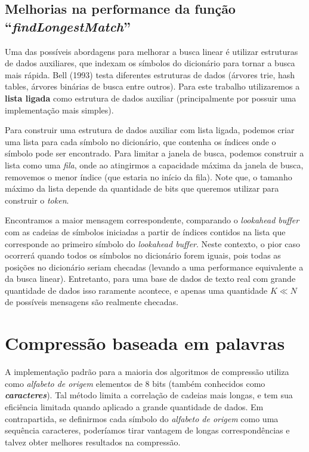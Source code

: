 \subsection{Melhorias na performance da função ``\emph{findLongestMatch}'' }

Uma das possíveis abordagens para melhorar a busca linear é utilizar estruturas de dados auxiliares, que indexam os símbolos do dicionário para tornar a busca mais rápida.
Bell (1993) \cite{TD}  testa diferentes estruturas de dados (árvores trie, hash tables, árvores binárias de busca entre outros). 
Para este trabalho utilizaremos a \textbf{lista ligada} como estrutura de dados auxiliar (principalmente por possuir uma implementação mais simples). 

Para construir uma estrutura de dados auxiliar com lista ligada, podemos criar uma lista para cada símbolo no dicionário, que contenha os índices onde o símbolo pode ser encontrado.  
Para limitar a janela de busca, podemos construir a lista como uma \emph{fila}, onde ao atingirmos a capacidade máxima da janela de busca, removemos o menor índice (que estaria no início da fila). 
Note que, o tamanho máximo da lista depende da quantidade de bits que queremos utilizar para construir o \emph{token}.

Encontramos a maior mensagem correspondente, comparando o \emph{lookahead buffer} com as cadeias de símbolos iniciadas a partir de índices contidos na lista que corresponde ao primeiro símbolo do \emph{lookahead buffer}.
Neste contexto, o pior caso ocorrerá quando todos os símbolos no dicionário forem iguais, pois todas as posições no dicionário seriam checadas (levando a uma performance equivalente a da busca linear).
Entretanto, para uma base de dados de texto real com grande quantidade de dados isso raramente acontece, e apenas uma quantidade $K \ll N$ de possíveis mensagens são realmente checadas.

\section{Compressão baseada em palavras}
A implementação padrão para a maioria dos algoritmos de compressão utiliza como \emph{alfabeto de origem} elementos de 8 bits (também conhecidos como \textbf{\emph{caracteres}}).
Tal método limita a correlação de cadeias mais longas, e tem sua eficiência limitada quando aplicado a grande quantidade de dados. 
Em contrapartida, se definirmos cada símbolo do \emph{alfabeto de origem} como uma sequência caracteres, poderíamos tirar vantagem de longas correspondências e talvez obter melhores resultados na compressão.

